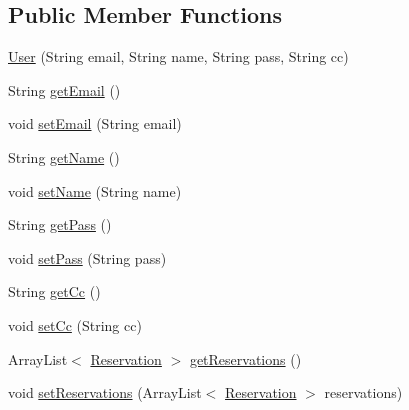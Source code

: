 \subsection*{Public Member Functions}
\begin{DoxyCompactItemize}
\item 
\mbox{\hyperlink{classbspq18__e4_1_1_gestion_hotelera_1_1server_1_1data_1_1_user_ac6613f3cb753c9f9eb166b933a0376fc}{User}} (String email, String name, String pass, String cc)
\item 
String \mbox{\hyperlink{classbspq18__e4_1_1_gestion_hotelera_1_1server_1_1data_1_1_user_a1633df41e068246bf59021c5bd2b1912}{get\+Email}} ()
\item 
void \mbox{\hyperlink{classbspq18__e4_1_1_gestion_hotelera_1_1server_1_1data_1_1_user_a05629d5975b2f335113156a8ab99b05b}{set\+Email}} (String email)
\item 
String \mbox{\hyperlink{classbspq18__e4_1_1_gestion_hotelera_1_1server_1_1data_1_1_user_a5ace6f8ae877d5d31a959b637a915446}{get\+Name}} ()
\item 
void \mbox{\hyperlink{classbspq18__e4_1_1_gestion_hotelera_1_1server_1_1data_1_1_user_a1df23b85a464dceb3865a7b22225427a}{set\+Name}} (String name)
\item 
String \mbox{\hyperlink{classbspq18__e4_1_1_gestion_hotelera_1_1server_1_1data_1_1_user_af6c45fa99a73eec0843536213dcdec12}{get\+Pass}} ()
\item 
void \mbox{\hyperlink{classbspq18__e4_1_1_gestion_hotelera_1_1server_1_1data_1_1_user_a231dae843523e7e247b8448a23fca6a5}{set\+Pass}} (String pass)
\item 
String \mbox{\hyperlink{classbspq18__e4_1_1_gestion_hotelera_1_1server_1_1data_1_1_user_a66fcb5e6e5da963eaf9744a094f4d77c}{get\+Cc}} ()
\item 
void \mbox{\hyperlink{classbspq18__e4_1_1_gestion_hotelera_1_1server_1_1data_1_1_user_aa0c655c416e7229c485ec90cd863ab49}{set\+Cc}} (String cc)
\item 
Array\+List$<$ \mbox{\hyperlink{classbspq18__e4_1_1_gestion_hotelera_1_1server_1_1data_1_1_reservation}{Reservation}} $>$ \mbox{\hyperlink{classbspq18__e4_1_1_gestion_hotelera_1_1server_1_1data_1_1_user_ab5fd3873a45e5d2f997c9b3d9173141c}{get\+Reservations}} ()
\item 
void \mbox{\hyperlink{classbspq18__e4_1_1_gestion_hotelera_1_1server_1_1data_1_1_user_ab5911c80cf326d7552f76743a479cb04}{set\+Reservations}} (Array\+List$<$ \mbox{\hyperlink{classbspq18__e4_1_1_gestion_hotelera_1_1server_1_1data_1_1_reservation}{Reservation}} $>$ reservations)

\end{DoxyCompactItemize}
